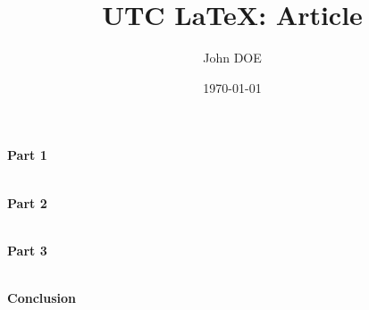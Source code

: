 \documentclass[a4paper,12pt]{article}
\title{UTC \LaTeX : Article}
\author{John DOE}
\date{\today}
\begin{document}
\titrearticle

\textbf{Part 1}

\lipsum[1] \\

\textbf{Part 2}

\lipsum[2] \\

\textbf{Part 3}

\lipsum[3] \\

\textbf{Conclusion}

\lipsum[4]
\end{document}
